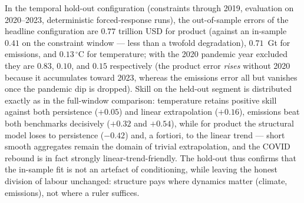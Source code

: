 \documentclass[a4paper,fleqn]{cas-sc}
\begin{document}
In the temporal hold-out configuration (constraints through 2019, evaluation on 2020--2023,
deterministic forced-response runs), the out-of-sample errors of the headline configuration are
$0.77$ trillion USD for product (against an in-sample $0.41$ on the constraint window --- less
than a twofold degradation), $0.71$~Gt for emissions, and $0.13\,^\circ$C for temperature; with
the 2020 pandemic year excluded they are $0.83$, $0.10$, and $0.15$ respectively (the product
error \emph{rises} without 2020 because it accumulates toward 2023, whereas the emissions error
all but vanishes once the pandemic dip is dropped). Skill on the held-out segment is
distributed exactly as in the full-window comparison: temperature retains positive skill against
both persistence ($+0.05$) and linear extrapolation ($+0.16$), emissions beat both benchmarks
decisively ($+0.32$ and $+0.54$), while for product the structural model loses to persistence
($-0.42$) and, a fortiori, to the linear trend --- short smooth aggregates remain the domain of
trivial extrapolation, and the COVID rebound is in fact strongly linear-trend-friendly. The
hold-out thus confirms that the in-sample fit is not an artefact of conditioning, while leaving
the honest division of labour unchanged: structure pays where dynamics matter (climate,
emissions), not where a ruler suffices.
\end{document}
